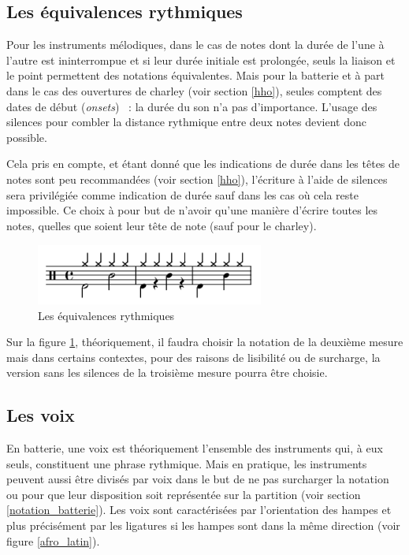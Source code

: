 \subsection*{Les équivalences rythmiques}
Pour les instruments mélodiques, dans le cas de notes dont la durée de l’une à
l’autre est ininterrompue et si leur durée initiale est prolongée, seuls la
liaison et le point permettent des notations équivalentes. Mais pour la
batterie et à part dans le cas des ouvertures de charley (voir section
\ref{hho}), seules comptent des dates de début (\textit{onsets})~ : la durée du son n’a
pas d’importance. L’usage des silences pour combler la distance rythmique entre
deux notes devient donc possible.

Cela pris en compte, et étant donné que les indications de durée dans les têtes
de notes sont peu recommandées (voir section \ref{hho}), l’écriture à l’aide de
silences sera privilégiée comme indication de durée sauf dans les cas où cela
reste impossible. Ce choix à pour but de n’avoir qu’une manière d’écrire toutes
les notes, quelles que soient leur tête de note (sauf pour le charley).

\begin{figure}[h]
	\centering
	\includegraphics[height=20mm, width=75mm]{
    z_images/3_methodes/0_notation_de_la_batterie/6_equivalence.png}
	\caption{Les équivalences rythmiques}
	\label{equivalence}
\end{figure}

Sur la figure \ref{equivalence}, théoriquement, il faudra choisir la notation
de la deuxième mesure mais dans certains contextes, pour des raisons de
lisibilité ou de surcharge, la version sans les silences de la troisième mesure
pourra être choisie.

\subsection*{Les voix}


En batterie, une voix est théoriquement l’ensemble des instruments qui, à eux
seuls, constituent une phrase rythmique. Mais en pratique, les instruments
peuvent aussi être divisés par voix dans le but de ne pas surcharger la
notation ou pour que leur disposition soit représentée sur la
partition (voir section \ref{notation_batterie}).
Les voix sont caractérisées par l’orientation des hampes et plus précisément
par les ligatures si les hampes sont dans la même direction (voir figure
\ref{afro_latin}).

